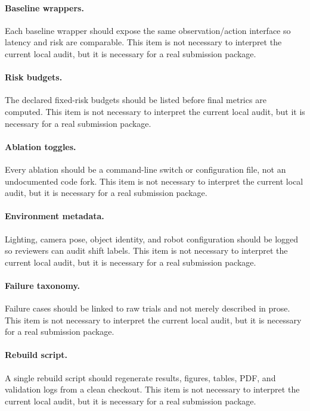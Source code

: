 \documentclass{article}
\begin{document}
\paragraph{Baseline wrappers.} Each baseline wrapper should expose the same observation/action interface so latency and risk are comparable. This item is not necessary to interpret the current local audit, but it is necessary for a real submission package.
\paragraph{Risk budgets.} The declared fixed-risk budgets should be listed before final metrics are computed. This item is not necessary to interpret the current local audit, but it is necessary for a real submission package.
\paragraph{Ablation toggles.} Every ablation should be a command-line switch or configuration file, not an undocumented code fork. This item is not necessary to interpret the current local audit, but it is necessary for a real submission package.
\paragraph{Environment metadata.} Lighting, camera pose, object identity, and robot configuration should be logged so reviewers can audit shift labels. This item is not necessary to interpret the current local audit, but it is necessary for a real submission package.
\paragraph{Failure taxonomy.} Failure cases should be linked to raw trials and not merely described in prose. This item is not necessary to interpret the current local audit, but it is necessary for a real submission package.
\paragraph{Rebuild script.} A single rebuild script should regenerate results, figures, tables, PDF, and validation logs from a clean checkout. This item is not necessary to interpret the current local audit, but it is necessary for a real submission package.
\begingroup
\raggedright


\endgroup
\end{document}
